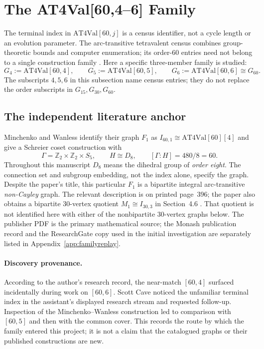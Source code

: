 \begingroup
\renewcommand{\thesection}{2A}
\section{The AT4Val[60,4--6] Family}\label{sec:censusfamily}
The terminal index in $\mathrm{AT4Val}[60,j]$ is a census identifier, not a cycle length or an evolution parameter. The arc-transitive tetravalent census combines group-theoretic bounds and computer enumeration; its order-$60$ entries need not belong to a single construction family \citep{psv2013,psvbound,graphsym}. Here a specific three-member family is studied:
\begin{equation}
G_4:=\mathrm{AT4Val}[60,4],\qquad
G_5:=\mathrm{AT4Val}[60,5],\qquad
G_6:=\mathrm{AT4Val}[60,6]\cong G_{60}.
\tag{F1}\label{eq:familylabels}
\end{equation}
The subscripts $4,5,6$ in this subsection name census entries; they do not replace the order subscripts in $G_{15},G_{30},G_{60}$.

\subsection*{The independent literature anchor}
Minchenko and Wanless identify their graph $F_1$ as $I_{60,1}\cong\mathrm{AT4Val}[60][4]$ and give a Schreier coset construction with
\[
\Gamma=\mathbb Z_2\times\mathbb Z_2\times S_5,
\qquad H\cong D_8,\qquad [\Gamma:H]=480/8=60.
\]
Throughout this manuscript $D_8$ means the dihedral group of \emph{order eight}. The connection set and subgroup embedding, not the index alone, specify the graph. Despite the paper's title, this particular $F_1$ is a bipartite integral arc-transitive \emph{non-Cayley} graph. The relevant description is on printed page~396; the paper also obtains a bipartite $30$-vertex quotient $M_1\cong I_{30,3}$ in Section~4.6 \citep{minchenko2015}. That quotient is not identified here with either of the nonbipartite $30$-vertex graphs below. The publisher PDF is the primary mathematical source; the Monash publication record and the ResearchGate copy used in the initial investigation are separately listed in Appendix~\ref{app:familyreplay}.

\paragraph{Discovery provenance.}
According to the author's research record, the near-match $[60,4]$ surfaced incidentally during work on $[60,6]$. Scott Cave noticed the unfamiliar terminal index in the assistant's displayed research stream and requested follow-up. Inspection of the Minchenko--Wanless construction led to comparison with $[60,5]$ and then with the common cover. This records the route by which the family entered this project; it is not a claim that the catalogued graphs or their published constructions are new.

